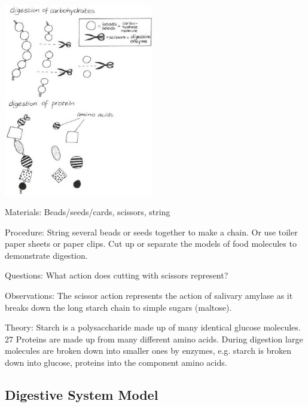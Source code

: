 \begin{multicols}{2}
\begin{center}
\includegraphics[width=0.49\textwidth]{./img/vso/digestion-models.jpg}
\end{center}

\begin{description*}
\item[Materials:]{Beads/seeds/cards, scissors, string}
\item[Procedure:]{String several beads or seeds together to make a chain. Or use toiler paper sheets or paper clips. Cut up or separate the models of food molecules to
demonstrate digestion.}
\item[Questions:]{What action does cutting with scissors represent?}
\item[Observations:]{The scissor action represents the action of salivary amylase as it breaks down the long
starch chain to simple sugars (maltose).}
\item[Theory:]{Starch is a polysaccharide made up of many identical glucose molecules. 27
Proteins are made up from many different amino acids. During
digestion large molecules are broken down into smaller ones by
enzymes, e.g. starch is broken down into glucose, proteins into the
component amino acids.}
\end{description*}

\vfill
\columnbreak

\subsection{Digestive System Model} %


\end{multicols}
